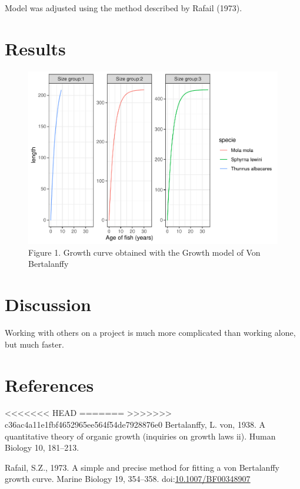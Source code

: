 \documentclass[]{elsarticle} %
\begin{document}
Model was adjusted using the method described by Rafail (1973).

\section{Results}\label{results}

\begin{figure}
\centering
\includegraphics{ElsevierRBertalanffyPackage_files/figure-latex/unnamed-chunk-1-1.pdf}
\caption{Figure 1. Growth curve obtained with the Growth model of Von
Bertalanffy}
\end{figure}

\section{Discussion}\label{discussion}

Working with others on a project is much more complicated than working
alone, but much faster.

\section*{References}\label{references}

\hypertarget{refs}{}
<<<<<<< HEAD
\hypertarget{ref-Bertalanffy1938}{}
=======
\leavevmode\hypertarget{ref-Bertalanffy1938}{}%
>>>>>>> c36ac4a11e1fbf4652965ee564f54de7928876e0
Bertalanffy, L. von, 1938. A quantitative theory of organic growth
(inquiries on growth laws ii). Human Biology 10, 181--213.

\hypertarget{ref-rafail_simple_1973}{}
Rafail, S.Z., 1973. A simple and precise method for fitting a von
Bertalanffy growth curve. Marine Biology 19, 354--358.
doi:\href{https://doi.org/10.1007/BF00348907}{10.1007/BF00348907}
\end{document}
